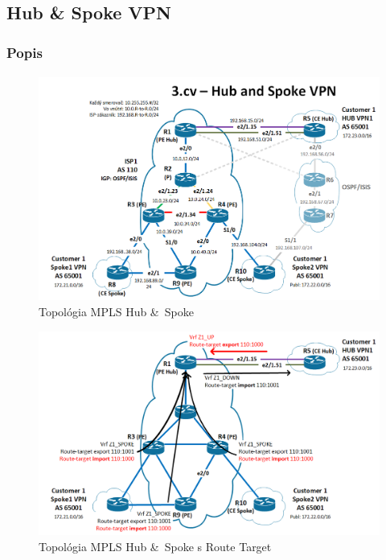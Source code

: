 \documentclass[12pt,twoside,a4paper]{report}
\begin{document}
\subsection{Hub \& Spoke VPN}
\subsubsection{Popis}
\paragraph{}

\begin{figure}[!htbp]
\centering
\includegraphics[width=14cm,keepaspectratio]{mpls_hub_spoke_topo}
\caption{Topológia MPLS Hub \& Spoke}
\label{fig:mpls_hub_spoke_topo}
\end{figure}

\begin{figure}[!htbp]
\centering
\includegraphics[width=14cm,keepaspectratio]{mpls_hub_spoke_route_target_topo}
\caption{Topológia MPLS Hub \& Spoke s Route Target}
\label{fig:mpls_hub_spoke_route_target_topo}
\end{figure}
\end{document}
